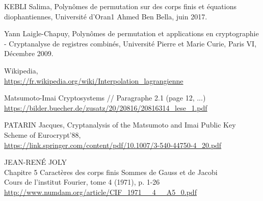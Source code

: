 \documentclass[12pt]{article}
\theoremstyle{remark}\newtheorem{note}{Note}
\theoremstyle{remark}\newtheorem{nota}{Notation}
\theoremstyle{definition}
\begin{document}
\begin{thebibliography}{9}
	KEBLI Salima,
	Polynômes de permutation sur des corps finis et équations diophantiennes,
	Université d'Oran1 Ahmed Ben Bella,
	juin 2017.

	Yann Laigle-Chapuy,
	Polynômes de permutation et applications en cryptographie - Cryptanalyse de registres combinés,
	Université Pierre et Marie Curie, Paris VI,
	Décembre 2009.

	Wikipedia,\\
	\url{https://fr.wikipedia.org/wiki/Interpolation_lagrangienne}
	
	Matsumoto-Imai Cryptosystems // Paragraphe 2.1 (page 12, ...)\\
	\url{https://bilder.buecher.de/zusatz/20/20816/20816314\_lese\_1.pdf}
	
	PATARIN Jacques,
	Cryptanalysis of the Matsumoto and Imai Public Key Scheme of Eurocrypt'88,\\
	\url{https://link.springer.com/content/pdf/10.1007/3-540-44750-4\_20.pdf}
	
	JEAN-RENÉ JOLY\\
	Chapitre 5 Caractères des corps finis Sommes de Gauss et de Jacobi\\
	Cours de l’institut Fourier, tome 4 (1971), p. 1-26\\
	\url{http://www.numdam.org/article/CIF_1971__4__A5_0.pdf}
	
\end{thebibliography}
\end{document}
